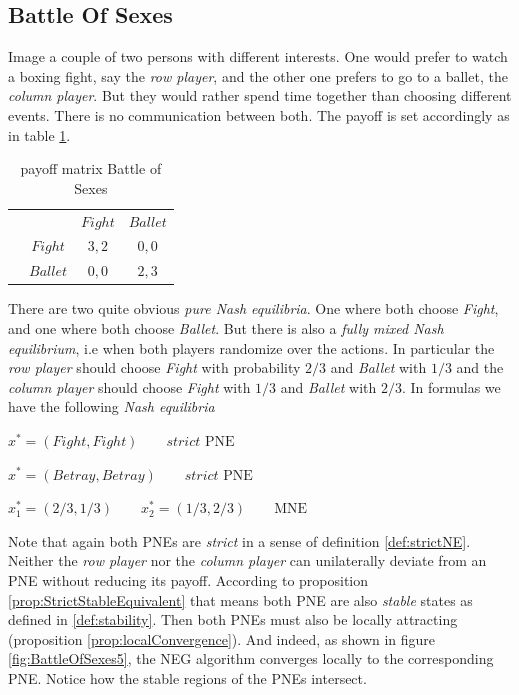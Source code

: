 \subsection{Battle Of Sexes}\label{subsection:battleOfSexes}

Image a couple of two persons with different interests. One would prefer to watch a boxing fight, say the \textit{row player}, and the other one prefers to go to a ballet, the \textit{column player}. But they would rather spend time together than choosing different events. There is no communication between both. The payoff is set accordingly as in table \ref{tab:payoffBattleOfSexes}.

\begin{table}[H]\centering
\setlength{\extrarowheight}{2pt}
\begin{tabular}{cc|c|c|}
  & \multicolumn{1}{c}{} & \multicolumn{1}{c}{$Fight$}  & \multicolumn{1}{c}{$Ballet$} \\\cline{3-4}
  & $Fight$ & $3,2$ & $0,0$ \\\cline{3-4}
  & $Ballet$ & $0,0$ & $2,3$ \\\cline{3-4}
\end{tabular}\caption{\label{tab:payoffBattleOfSexes}payoff matrix Battle of Sexes}
\end{table}

There are two quite obvious \textit{pure Nash equilibria}. One where both choose \textit{Fight}, and one where both choose \textit{Ballet}. But there is also a \textit{fully mixed Nash equilibrium}, i.e when both players randomize over the actions. In particular the \textit{row player} should choose \textit{Fight} with probability $2/3$ and \textit{Ballet} with $1/3$ and the \textit{column player} should choose \textit{Fight} with $1/3$ and \textit{Ballet} with $2/3$. In formulas we have the following \textit{Nash equilibria}

\begin{description}\centering
    \item $x^{*} = (Fight,Fight) \qquad \textit{strict }\text{PNE}$
    \item $x^{*} = (Betray,Betray) \qquad \textit{strict }\text{PNE}$
    \item $x_{1}^* = (2/3,1/3) \qquad x_{2}^* = (1/3,2/3) \qquad \text{MNE}$
\end{description}

Note that again both PNEs are \textit{strict} in a sense of definition \ref{def:strictNE}. Neither the \textit{row player} nor the \textit{column player} can unilaterally deviate from an PNE without reducing its payoff. According to proposition \ref{prop:StrictStableEquivalent} that means both PNE are also \textit{stable} states as defined in \ref{def:stability}. Then both PNEs must also be locally attracting (proposition \ref{prop:localConvergence}). And indeed, as shown in figure \ref{fig:BattleOfSexes5}, the NEG algorithm converges locally to the corresponding PNE. Notice how the stable regions of the PNEs intersect. 

